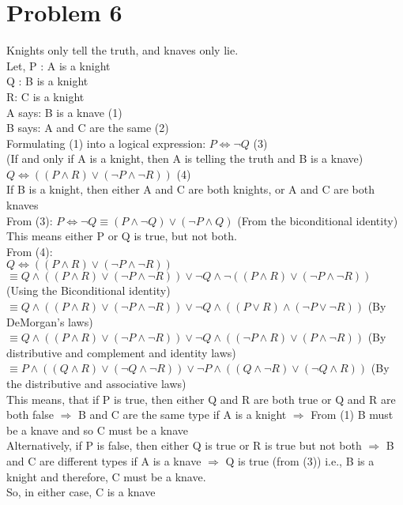 \documentclass[english]{article}
\begin{document}
\section*{Problem 6}
Knights only tell the truth, and knaves only lie. \\
Let, P : A is a knight \\
Q : B is a knight \\
R: C is a knight \\
A says: B is a knave \qquad (1) \\
B says: A and C are the same \qquad (2) \\
Formulating (1) into a logical expression:
$ P \iff \lnot Q$ \qquad(3) \\ (If and only if A is a knight, then A is telling the truth and B is a knave) \\
$ Q \iff ((P \land R) \lor (\lnot P \land \lnot R)) $ \qquad (4) \\ If B is a knight, then either A and C are both knights, or A and C are both knaves \\
From (3):
$ P \iff \lnot Q \equiv (P \land \lnot Q) \lor (\lnot P \land Q)$ \qquad (From the biconditional identity) \\
This means either P or Q is true, but not both.  \\
From (4): \\
$ Q \iff ((P \land R) \lor (\lnot P \land \lnot R))$\\$ \equiv Q \land ((P \land R) \lor (\lnot P \land \lnot R)) \lor \lnot Q \land \lnot ((P \land R) \lor (\lnot P \land \lnot R)) $ \qquad  (Using the Biconditional identity) \\
$\equiv Q \land ((P \land R) \lor (\lnot P \land \lnot R)) \lor \lnot Q \land ((P \lor R) \land (\lnot P \lor \lnot R)) $ \qquad (By DeMorgan's laws) \\
$ \equiv Q \land ((P \land R) \lor (\lnot P \land \lnot R)) \lor \lnot Q \land ((\lnot P \land R) \lor (P \land \lnot R))$ \qquad (By distributive and complement and identity laws) \\
$\equiv  P \land ( (Q \land R )\lor (\lnot Q \land \lnot R) ) \lor \lnot P \land ((Q \land \lnot R) \lor (\lnot Q \land R))$ \qquad (By the distributive and associative laws) \\
This means, that if P is true, then either Q and R are both true or Q and R are both false $\Rightarrow$ B and C are the same type if A is a knight $\Rightarrow$ From (1) B must be a knave and so C must be a knave \\
Alternatively, if P is false, then either Q is true or R is true but not both $\Rightarrow$ B and C are different types if A is a knave $\Rightarrow$ Q is true (from (3)) i.e., B is a knight and therefore, C must be a knave. \\
So, in either case, C is a knave
\end{document}
